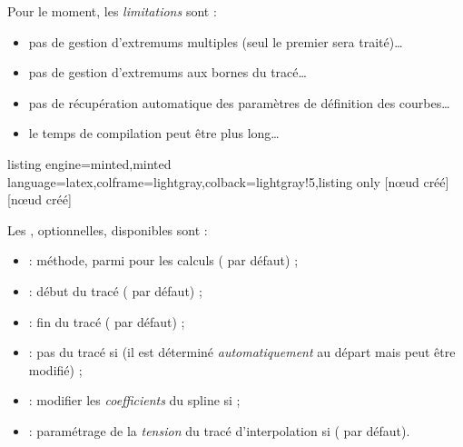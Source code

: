 \documentclass[11pt,a4paper]{ltxdoc}
\begin{document}
\smallskip

{\small\faBomb} Pour le moment, les \textit{limitations} sont :

\begin{itemize}
	\item pas de gestion d'extremums multiples (seul le premier sera traité)\ldots
	\item pas de gestion d'extremums aux bornes du tracé\ldots
	\item pas de récupération automatique des paramètres de définition des courbes\ldots
	\item le temps de compilation peut être plus long\ldots
\end{itemize}

\begin{tcblisting}{listing engine=minted,minted language=latex,colframe=lightgray,colback=lightgray!5,listing only}
[nœud créé]
[nœud créé]
\end{tcblisting}

Les \MontreCode{[clés]}, optionnelles, disponibles sont :

\smallskip

\begin{itemize}
	\item {} : méthode, parmi  pour les calculs ( par défaut) ;
	\item {} : début du tracé ( par défaut) ;
	\item {} : fin du tracé ( par défaut) ;
	\item {} : pas du tracé si  (il est déterminé \textit{automatiquement} au départ mais peut être modifié) ;
	\item {} : modifier les \textit{coefficients} du spline si  ;
	\item {} : paramétrage de la \textit{tension} du tracé d'interpolation si ( par défaut).
\end{itemize}
\end{document}
